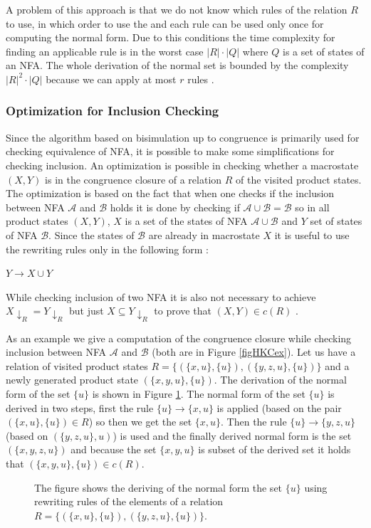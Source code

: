 A problem of this approach is that we do not know which rules of the relation $R$ to use, in which order to use the 
and each rule can be used only once for computing the normal form. 
Due to this conditions the time complexity for finding an applicable rule is in the worst case $|R|\cdot|Q|$ where $Q$ is a set of states of an NFA.
The whole derivation of the normal set is bounded by the complexity $|R|^2 \cdot |Q|$ because we can apply at most $r$ rules \cite{popl13}.

\subsubsection{Optimization for Inclusion Checking}
\label{congrOpt}
Since the algorithm based on bisimulation up to congruence is primarily used for checking equivalence of NFA, it is possible to make some simplifications for
checking inclusion. An optimization is possible in checking whether a macrostate $(X,Y)$ is in the congruence closure of a relation $R$ of the visited
product states. The optimization
is based on the fact that when one checks if the inclusion between NFA $\mathcal{A}$ and $\mathcal{B}$ holds it is done by checking if $\mathcal{A}\cup\mathcal{B}=
\mathcal{B}$ so in all product states $(X,Y)$, $X$ is a set of the states of NFA $\mathcal{A}\cup\mathcal{B}$ and $Y$ set of states of NFA $\mathcal{B}$. Since the
states of $\mathcal{B}$ are already in macrostate $X$ it is useful to use the rewriting rules only in the following form \cite{popl13}:
\begin{center}
$Y\rightarrow X\cup Y$
\end{center}
While checking inclusion of two NFA it is also not necessary to achieve $X{\downarrow_R}=Y{\downarrow_R}$ 
but just $X \subseteq Y{\downarrow_R}$ to prove that $(X,Y)\in c(R)$ \cite{popl13}.

As an example we give a computation of the congruence closure while checking inclusion between NFA $\mathcal{A}$ and $\mathcal{B}$ (both are in Figure 
\ref{figHKCex}). Let us have a relation of visited product states $R=\{(\{x,u\},\{u\}),(\{y,z,u\},\{u\})\}$ and a 
newly generated product state $(\{x,y,u\},\{u\})$. The
derivation of the normal form of the set $\{u\}$ is shown in Figure \ref{figHKCRewO}. 
The normal form of the set $\{u\}$ is derived in two steps, first the rule $\{u\}\rightarrow\{x,u\}$ is applied (based on the pair $(\{x,u\},\{u\})\in R$) 
so then we get the set $\{x,u\}$. 
Then the rule $\{u\}\rightarrow\{y,z,u\}$ (based on $(\{y,z,u\},u)$) is used and the finally derived normal form is the set $(\{x,y,z,u\})$ 
and because the set $\{x,y,u\}$ is subset of the derived set it holds that $(\{x,y,u\},\{u\})\in c(R)$.
\begin{figure}[bt]
  \begin{center}
    
    \caption{The figure shows the deriving of the normal form the set $\{u\}$ using rewriting
      rules of the elements of a relation $R=\{(\{x,u\},\{u\}),(\{y,z,u\},\{u\})\}$.}
    \label{figHKCRewO}
  \end{center}
\end{figure}

